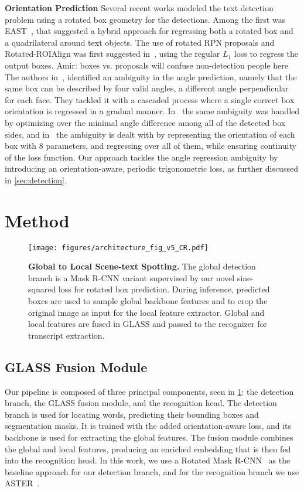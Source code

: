 \documentclass[runningheads]{llncs}
\newcommand{\colornote}[3]{{\color{#1}\small\textsf{#2:  #3}\normalfont}}
\newcommand{\colornote}[3]{}
\newcommand {\amir}[1]{\colornote{blue}{Amir}{#1}}
\begin{document}
\noindent \textbf{Orientation Prediction}
Several recent works modeled the text detection problem using a rotated box geometry for the detections.
Among the first was EAST~\cite{zhou2017east}, that suggested a hybrid approach for regressing both a rotated box and a quadrilateral around text objects.
The use of rotated RPN proposals and Rotated-ROIAlign was first suggested in~\cite{ma2018arbitrary}, using the regular $L_1$ loss to regress the output boxes. \amir{boxes vs. proposals will confuse non-detection people here}
The authors in~\cite{zhu2019rotated}, identified an ambiguity in the angle prediction, namely that the same box can be described by four valid angles, a different angle perpendicular for each face. 
They tackled it with a cascaded process where a single correct box orientation is regressed in a gradual manner. 
In~\cite{lee2021rotated} the same ambiguity was handled by optimizing over the minimal angle difference among all of the detected box sides, and in~\cite{qian2021learning} the ambiguity is dealt with by representing the orientation of each box with 8 parameters, and regressing over all of them, while ensuring continuity of the loss function.
Our approach tackles the angle regression ambiguity by introducing an orientation-aware, periodic trigonometric loss, as further discussed in \cref{sec:detection}.



 
\section{Method}
\label{sec:method}
\begin{figure}[t]
 \centering
  \texttt{[image: figures/architecture\_fig\_v5\_CR.pdf]}
  \caption{\textbf{Global to Local Scene-text Spotting.} The global detection branch is a Mask R-CNN variant supervised by our novel sine-squared loss for rotated box prediction. During inference, predicted boxes are used to sample global backbone features and to crop the original image as input for the local feature extractor. Global and local features are fused in GLASS and passed to the recognizer for transcript extraction.}
  \label{fig:framework}
\end{figure}
\subsection{GLASS Fusion Module}
\label{sec:GLASS}
Our pipeline is composed of three principal components, seen in \cref{fig:framework}: the detection branch, the GLASS fusion module, and the recognition head.
The detection branch is used for locating words,  predicting their bounding boxes and segmentation masks.
It is trained with the added orientation-aware loss, and its backbone is used for extracting the global features.
The fusion module combines the global and local features, producing an enriched embedding that is then fed into the recognition head.
In this work, we use a Rotated Mask R-CNN~\cite{he2017mask,ma2018arbitrary} as the baseline approach for our detection branch, and for the recognition branch we use ASTER~\cite{shi2018aster}.
\end{document}

